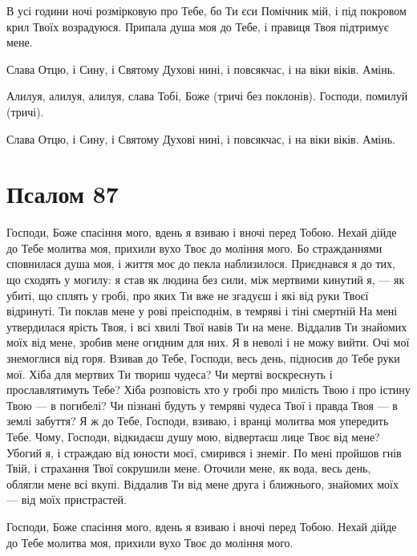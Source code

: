 \documentclass[chapters.tex]{subfiles}
\begin{document}
В усі години ночі розмірковую про Тебе, бо Ти єси Помічник мій, і під покровом крил Твоїх возрадуюся. Припала душа моя до Тебе, і правиця Твоя підтримує мене.

Слава Отцю, і Сину, і Святому Духові нині, і повсякчас, і на віки віків. Амінь.

Алилуя, алилуя, алилуя, слава Тобі, Боже (тричі без поклонів). Господи, помилуй (тричі).

Слава Отцю, і Сину, і Святому Духові нині, і повсякчас, і на віки віків. Амінь.

\section{Псалом 87}
Господи, Боже спасіння мого, вдень я взиваю і вночі перед Тобою. Нехай дійде до Тебе молитва моя, прихили вухо Твоє до моління мого. Бо стражданнями сповнилася душа моя, і життя моє до пекла наблизилося. Приєднався я до тих, що сходять у могилу: я став як людина без сили, між мертвими кинутий я, — як убиті, що сплять у гробі, про яких Ти вже не згадуєш і які від руки Твоєї відринуті. Ти поклав мене у рові преісподнім, в темряві і тіні смертній На мені утвердилася ярість Твоя, і всі хвилі Твої навів Ти на мене. Віддалив Ти знайомих моїх від мене, зробив мене огидним для них. Я в неволі і не можу вийти. Очі мої знемоглися від горя. Взивав до Тебе, Господи, весь день, підносив до Тебе руки мої. Хіба для мертвих Ти твориш чудеса? Чи мертві воскреснуть і прославлятимуть Тебе? Хіба розповість хто у гробі про милість Твою і про істину Твою — в погибелі? Чи пізнані будуть у темряві чудеса Твої і правда Твоя — в землі забуття? Я ж до Тебе, Господи, взиваю, і вранці молитва моя упередить Тебе. Чому, Господи, відкидаєш душу мою, відвертаєш лице Твоє від мене? Убогий я, і страждаю від юности моєї, смирився і знеміг. По мені пройшов гнів Твій, і страхання Твої сокрушили мене. Оточили мене, як вода, весь день, облягли мене всі вкупі. Віддалив Ти від мене друга і ближнього, знайомих моїх — від моїх пристрастей.

Господи, Боже спасіння мого, вдень я взиваю і вночі перед Тобою. Нехай дійде до Тебе молитва моя, прихили вухо Твоє до моління мого.
\end{document}
